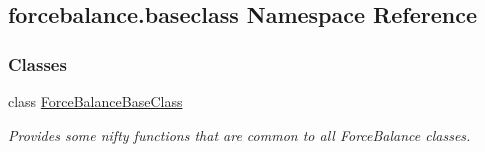\hypertarget{namespaceforcebalance_1_1baseclass}{\subsection{forcebalance.\-baseclass Namespace Reference}
\label{namespaceforcebalance_1_1baseclass}
}
\subsubsection*{Classes}
\begin{DoxyCompactItemize}
\item 
class \hyperlink{classforcebalance_1_1baseclass_1_1ForceBalanceBaseClass}{Force\-Balance\-Base\-Class}
\begin{DoxyCompactList}\small\item\em Provides some nifty functions that are common to all Force\-Balance classes. \end{DoxyCompactList}\end{DoxyCompactItemize}
